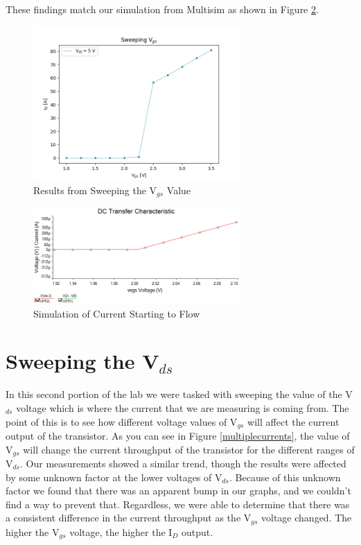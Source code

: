 \documentclass{article}
\begin{document}
These findings match our simulation from Multisim as shown in Figure 
\ref{simcurrentstarts}.
\begin{figure}[!htb]
  \begin{center}
    \includegraphics[width=0.7\textwidth]{imgs/meas/sweepvgs}
  \end{center}
  \caption{Results from Sweeping the V$_{gs}$ Value}
  \label{results1}
\end{figure}
\begin{figure}[!htb]
  \begin{center}
    \includegraphics[width=0.7\textwidth]{imgs/sim/Id vs Vgs current starts}
  \caption{Simulation of Current Starting to Flow}
  \label{simcurrentstarts}
  \end{center}

\end{figure}

\section{Sweeping the V$_{ds}$}
In this second portion of the lab we were tasked with 
sweeping the value of the V$_{ds}$ voltage which 
is where the current that we are measuring is coming from.
The point of this is to see how different voltage values of 
V$_{gs}$ will affect the current output of the transistor.
As you can see in Figure \ref{multiplecurrents}, the value of 
V$_{gs}$ will change the current throughput of the transistor 
for the different ranges of V$_{ds}$. Our measurements showed
a similar trend, though the results were affected by some 
unknown factor at the lower voltages of V$_{ds}$. Because
of this unknown factor we found that there was an 
apparent bump in our graphs, and we couldn't find a way
to prevent that. Regardless, we were able to determine
that there was a consistent difference in the current 
throughput as the V$_{gs}$ voltage changed. The higher 
the V$_{gs}$ voltage, the higher the I$_D$ output.
\end{document}
